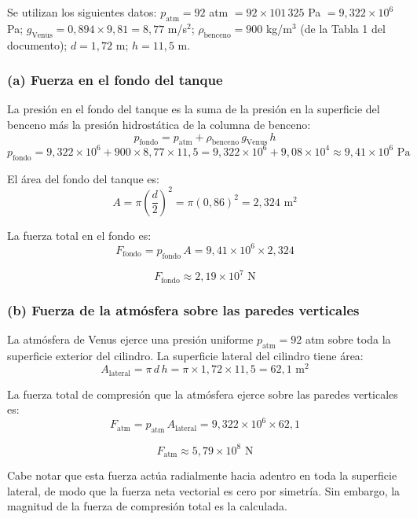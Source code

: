 \documentclass[a4paper]{article}
\begin{document}
Se utilizan los siguientes datos: $p_{\text{atm}} = 92$ atm $= 92 \times 101\,325$ Pa $= 9{,}322 \times 10^6$ Pa; $g_{\text{Venus}} = 0{,}894 \times 9{,}81 = 8{,}77$ m/s$^2$; $\rho_{\text{benceno}} = 900$ kg/m$^3$ (de la Tabla 1 del documento); $d = 1{,}72$ m; $h = 11{,}5$ m.

\subsubsection{(a) Fuerza en el fondo del tanque}

La presión en el fondo del tanque es la suma de la presión en la superficie del benceno más la presión hidrostática de la columna de benceno:
$$
p_{\text{fondo}} = p_{\text{atm}} + \rho_{\text{benceno}}\, g_{\text{Venus}}\, h
$$
$$
p_{\text{fondo}} = 9{,}322 \times 10^6 + 900 \times 8{,}77 \times 11{,}5 = 9{,}322 \times 10^6 + 9{,}08 \times 10^4 \approx 9{,}41 \times 10^6 \text{ Pa}
$$

El área del fondo del tanque es:
$$
A = \pi\left(\frac{d}{2}\right)^2 = \pi(0{,}86)^2 = 2{,}324 \text{ m}^2
$$

La fuerza total en el fondo es:
$$
F_{\text{fondo}} = p_{\text{fondo}}\, A = 9{,}41 \times 10^6 \times 2{,}324
$$

$$
\boxed{F_{\text{fondo}} \approx 2{,}19 \times 10^7 \text{ N}}
$$

\subsubsection{(b) Fuerza de la atmósfera sobre las paredes verticales}

La atmósfera de Venus ejerce una presión uniforme $p_{\text{atm}} = 92$ atm sobre toda la superficie exterior del cilindro. La superficie lateral del cilindro tiene área:
$$
A_{\text{lateral}} = \pi\, d\, h = \pi \times 1{,}72 \times 11{,}5 = 62{,}1 \text{ m}^2
$$

La fuerza total de compresión que la atmósfera ejerce sobre las paredes verticales es:
$$
F_{\text{atm}} = p_{\text{atm}}\, A_{\text{lateral}} = 9{,}322 \times 10^6 \times 62{,}1
$$

$$
\boxed{F_{\text{atm}} \approx 5{,}79 \times 10^8 \text{ N}}
$$

Cabe notar que esta fuerza actúa radialmente hacia adentro en toda la superficie lateral, de modo que la fuerza neta vectorial es cero por simetría. Sin embargo, la magnitud de la fuerza de compresión total es la calculada.

\end{document}
